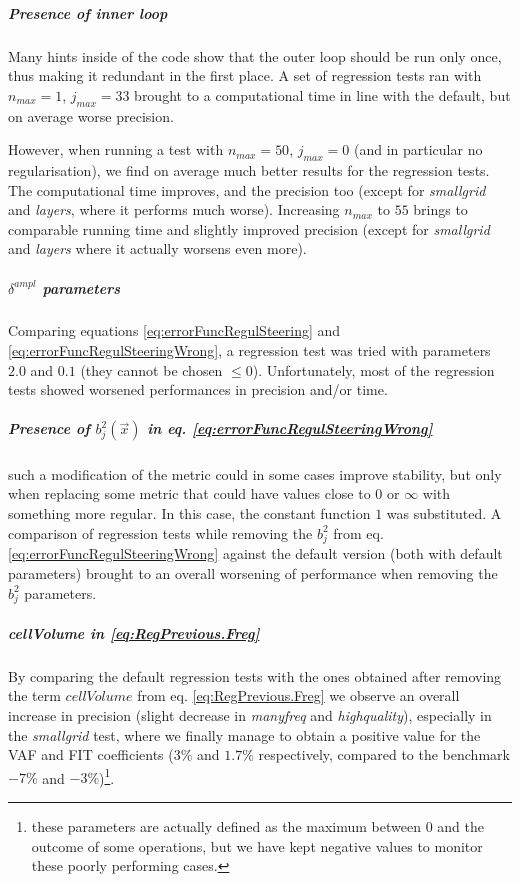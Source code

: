 \documentclass[10pt,a4paper]{article}
\begin{document}
{\subparagraph*{Presence of inner loop}
Many hints inside of the code show that the outer loop should be run only once, thus making it redundant in the first place. 
A set of regression tests ran with $n_{max}=1$, $j_{max}=33$ brought to a computational time in line with the default, but on average worse precision.
\newline 

However, when running a test with $n_{max}=50$, $j_{max}=0$ (and in particular no regularisation), we find on average much better results for the regression tests. 
The computational time improves, and the precision too (except for \textit{smallgrid} and \textit{layers}, where it performs much worse).
Increasing $n_{max}$ to $55$ brings to comparable running time and slightly improved precision (except for \textit{smallgrid} and \textit{layers} where it actually worsens even more).

\subparagraph*{$\delta^{ampl}$ parameters}
Comparing equations \eqref{eq:errorFuncRegulSteering} and \eqref{eq:errorFuncRegulSteeringWrong}, a regression test was tried with parameters $2.0$ and $0.1$ (they cannot be chosen $\leq 0$). 
Unfortunately, most of the regression tests showed worsened performances in precision and/or time.


\subparagraph*{Presence of $b_j^2(\vec{x})$ in eq. \eqref{eq:errorFuncRegulSteeringWrong}}
such a modification of the metric could in some cases improve stability, but only when replacing some metric that could have values close to $0$ or $\infty$ with something more regular. 
In this case, the constant function $1$ was substituted.
A comparison of regression tests while removing the $b^2_j$ from eq. \eqref{eq:errorFuncRegulSteeringWrong} against the default version (both with default parameters) brought to an overall worsening of performance when removing the $b^2_j$ parameters.



\subparagraph*{\textit{cellVolume} in \eqref{eq:RegPrevious.Freg}}
By comparing the default regression tests with the ones obtained after removing the term $cellVolume$ from eq. \eqref{eq:RegPrevious.Freg} we observe an overall increase in precision (slight decrease in \textit{manyfreq} and \textit{highquality}), especially in the \textit{smallgrid} test, where we finally manage to obtain a positive value for the VAF and FIT coefficients ($3\%$ and $1.7\%$ respectively, compared to the benchmark $-7\%$ and $-3\%$)\footnote{these parameters are actually defined as the maximum between 0 and the outcome of some operations, but we have kept negative values to monitor these poorly performing cases.}.
\newline

}
\end{document}
